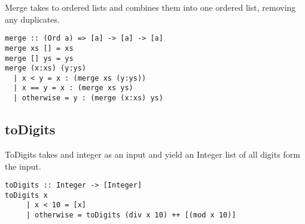 \documentclass[a4paper,11pt]{article}
\begin{document}
Merge takes to ordered lists and combines them into one ordered list, removing any duplicates.

\begin{lstlisting}
merge :: (Ord a) => [a] -> [a] -> [a]
merge xs [] = xs
merge [] ys = ys
merge (x:xs) (y:ys)
  | x < y = x : (merge xs (y:ys))
  | x == y = x : (merge xs ys)
  | otherwise = y : (merge (x:xs) ys)
\end{lstlisting}

\subsection{toDigits}

ToDigits takes and integer as an input and yield an Integer list of all digits form the input.

\begin{lstlisting}
toDigits :: Integer -> [Integer]
toDigits x
	 | x < 10 = [x]
	 | otherwise = toDigits (div x 10) ++ [(mod x 10)]
\end{lstlisting}
\end{document}
